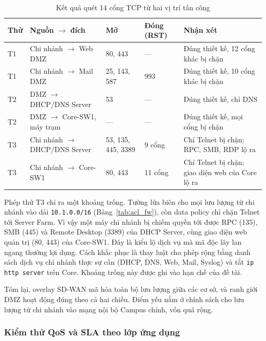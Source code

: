 \begin{table}[H]
    \centering
    \small
    \caption{Kết quả quét 14 cổng TCP từ hai vị trí tấn công}
    \label{tab:quet_cong}
    \begin{tabularx}{\textwidth}{|P{0.8cm}|L{3.8cm}|L{2.6cm}|L{2.2cm}|Y|}
        \hline
        \textbf{Thử} & \textbf{Nguồn $\rightarrow$ đích} & \textbf{Mở} & \textbf{Đóng (RST)} & \textbf{Nhận xét} \\
        \hline
        T1 & Chi nhánh $\rightarrow$ Web DMZ & 80, 443 & --- & Đúng thiết kế, 12 cổng khác bị chặn \\
        \hline
        T1 & Chi nhánh $\rightarrow$ Mail DMZ & 25, 143, 587 & 993 & Đúng thiết kế, 10 cổng khác bị chặn \\
        \hline
        T2 & DMZ $\rightarrow$ DHCP/DNS Server & 53 & --- & Đúng thiết kế, chỉ DNS \\
        \hline
        T2 & DMZ $\rightarrow$ Core-SW1, máy trạm & --- & --- & Đúng thiết kế, mọi cổng bị chặn \\
        \hline
        T3 & Chi nhánh $\rightarrow$ DHCP/DNS Server & 53, 135, 445, 3389 & 9 cổng & Chỉ Telnet bị chặn; RPC, SMB, RDP lộ ra \\
        \hline
        T3 & Chi nhánh $\rightarrow$ Core-SW1 & 80, 443 & 11 cổng & Chỉ Telnet bị chặn; giao diện web của Core lộ ra \\
        \hline
    \end{tabularx}
\end{table}

Phép thử T3 chỉ ra một khoảng trống. Tường lửa biên cho mọi lưu lượng từ chi nhánh vào dải \texttt{10.1.0.0/16} (Bảng~\ref{tab:acl_fw}), còn data policy chỉ chặn Telnet tới Server Farm. Vì vậy một máy chi nhánh bị chiếm quyền tới được RPC (135), SMB (445) và Remote Desktop (3389) của DHCP Server, cùng giao diện web quản trị (80, 443) của Core-SW1. Đây là kiểu lộ dịch vụ mà mã độc lây lan ngang thường lợi dụng. Cách khắc phục là thay luật cho phép rộng bằng danh sách dịch vụ chi nhánh thực sự cần (DHCP, DNS, Web, Mail, Syslog) và tắt \texttt{ip http server} trên Core. Khoảng trống này được ghi vào hạn chế của đề tài.

Tóm lại, overlay SD-WAN mã hóa toàn bộ lưu lượng giữa các cơ sở, và ranh giới DMZ hoạt động đúng theo cả hai chiều. Điểm yếu nằm ở chính sách cho lưu lượng từ chi nhánh vào mạng nội bộ Campus chính, vốn quá rộng.

\subsubsection{Kiểm thử QoS và SLA theo lớp ứng dụng}\label{sec:kiem_thu_qos}

